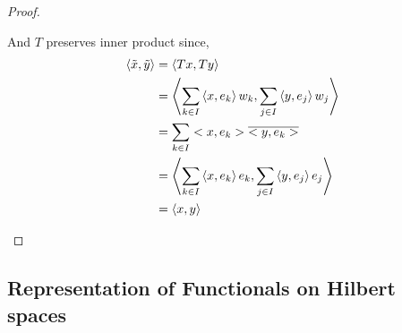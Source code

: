 \begin{proof}
	\begin{commentary}
	And $T$ preserves inner product since,
	\begin{align*}
		\left\langle \tilde{x},\tilde{y} \right\rangle 
		& = \left\langle Tx,Ty \right\rangle \\
		& = \left\langle \sum_{k \in I} \left\langle x,e_k \right\rangle w_k,\sum_{j \in I} \left\langle y,e_j \right\rangle w_j \right\rangle \\
		& = \sum_{k \in I} <x,e_k>\overline{<y,e_k>} \\
		& = \left\langle \sum_{k \in I} \left\langle x,e_k \right\rangle e_k,\sum_{j \in I} \left\langle y,e_j \right\rangle e_j \right\rangle \\
		& = \left\langle x,y \right\rangle
	\end{align*}
	\end{commentary}
\end{proof}


\setcounter{subsection}{7}

\subsection{Representation of Functionals on Hilbert spaces}

